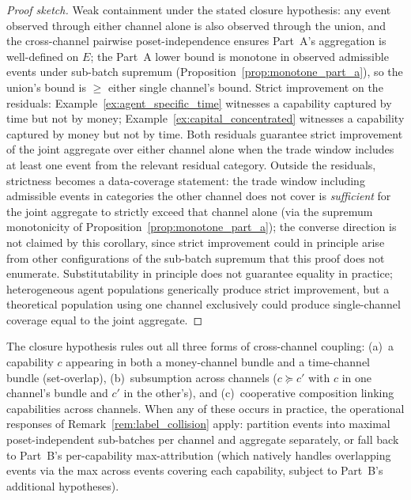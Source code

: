 \begin{proof}[Proof sketch]
Weak containment under the stated closure hypothesis: any event
observed through either channel alone is also observed through
the union, and the cross-channel pairwise poset-independence
ensures Part~A's aggregation is well-defined on $E$; the Part~A
lower bound is monotone in observed admissible events under
sub-batch supremum
(Proposition~\ref{prop:monotone_part_a}), so the union's bound
is $\geq$ either single channel's bound.  Strict improvement on the
residuals: Example~\ref{ex:agent_specific_time} witnesses
a capability captured by time but not by money;
Example~\ref{ex:capital_concentrated} witnesses a
capability captured by money but not by time.  Both residuals
guarantee strict improvement of the joint aggregate over either
channel alone when the trade window includes at least one event
from the relevant residual category.  Outside the residuals,
strictness becomes a data-coverage statement: the trade window
including admissible events in categories the other channel
does not cover is \emph{sufficient} for the joint aggregate to
strictly exceed that channel alone (via the supremum
monotonicity of Proposition~\ref{prop:monotone_part_a}); the
converse direction is not claimed by this corollary, since
strict improvement could in principle arise from other
configurations of the sub-batch supremum that this proof does
not enumerate.  Substitutability in principle does not
guarantee equality in practice; heterogeneous agent populations
generically produce strict improvement, but a theoretical
population using one channel exclusively could produce
single-channel coverage equal to the joint aggregate.
\end{proof}

\begin{remark}
\label{rem:cross_channel_overlap}
The closure hypothesis rules out all three forms of
cross-channel coupling: (a)~a capability $c$ appearing in both
a money-channel bundle and a time-channel bundle (set-overlap),
(b)~subsumption across channels ($c \succeq c'$ with $c$ in one
channel's bundle and $c'$ in the other's), and (c)~cooperative
composition linking capabilities across channels.  When any of
these occurs in practice, the operational responses of
Remark~\ref{rem:label_collision} apply: partition events into
maximal poset-independent sub-batches per channel and aggregate
separately, or fall back to Part~B's per-capability
max-attribution (which natively handles overlapping events via
the max across events covering each capability, subject to
Part~B's additional hypotheses).
\end{remark}

